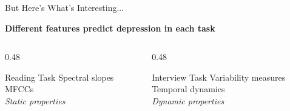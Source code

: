 \documentclass[aspectratio=169,11pt]{beamer}
\begin{document}
\begin{frame}{But Here's What's Interesting...}
    \begin{center}
        {\large\bfseries\color{uofgblue} Different features predict depression in each task}
    \end{center}
    
    \vspace{0.3cm}
    
    \begin{columns}[T]
        \begin{column}{0.48\textwidth}
            \begin{block}{\centering Reading Task}
                \centering
                \small
                Spectral slopes\\
                MFCCs\\[0.2cm]
                \textit{Static properties}
            \end{block}
        \end{column}
        
        \begin{column}{0.48\textwidth}
            \begin{block}{\centering Interview Task}
                \centering
                \small
                Variability measures\\
                Temporal dynamics\\[0.2cm]
                \textit{Dynamic properties}
            \end{block}
        \end{column}
    \end{columns}
    
    \vspace{0.5cm}
    
    \begin{center}
    \end{center}
\end{frame}
\end{document}
